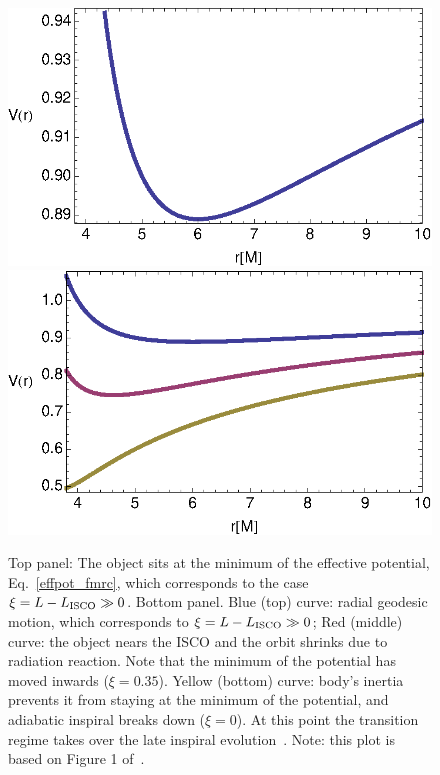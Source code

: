 \begin{figure}%
\includegraphics[height=0.6\textwidth,  clip]{figures/imrimri/effective_potential_nonpert.eps}
\includegraphics[height=0.6\textwidth,  clip]{figures/imrimri/effective_potential_pert.eps}
\caption{Top panel: The object sits at the minimum of the effective potential, Eq.~\eqref{effpot_fmrc}, which corresponds to the case  \(\xi = L-L_{\rm{ISCO}} \gg 0\). Bottom panel. Blue (top) curve: radial geodesic motion, which corresponds to \(\xi = L-L_{\rm{ISCO}} \gg 0\);  Red (middle) curve: the object nears the ISCO and the orbit shrinks due to radiation reaction. Note that the minimum of the potential has moved inwards (\(\xi = 0.35\)). Yellow (bottom) curve:  body's inertia prevents it from staying at the minimum of the potential, and adiabatic inspiral breaks down  (\(\xi = 0\)). At this point the transition regime takes over the late inspiral evolution~\cite{amos}. Note: this plot is based on Figure 1 of~\cite{amos}.}
\label{effpotper}
\end{figure}

